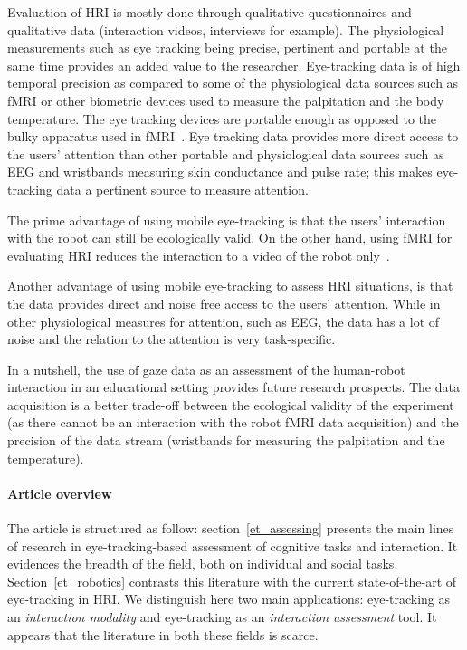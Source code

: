 \documentclass{sig-alternate}
\begin{document}
Evaluation of HRI is mostly done through qualitative questionnaires and
qualitative data (interaction videos, interviews for example). The physiological
measurements such as eye tracking being precise, pertinent and portable at the
same time provides an added value to the researcher.  Eye-tracking data is of
high temporal precision as compared to some of the physiological data sources
such as fMRI or other biometric devices used to measure the palpitation and the
body temperature. The eye tracking devices are portable enough as opposed to the
bulky apparatus used in fMRI~\cite{rosenthal2013neural}. Eye tracking data
provides more direct access to the users' attention than other portable and
physiological data sources such as EEG and wristbands measuring skin conductance
and pulse rate; this makes eye-tracking data a pertinent source to measure
attention.

The prime advantage of using mobile eye-tracking is that the users' interaction
with the robot can still be ecologically valid. On the other hand, using fMRI
for evaluating HRI reduces the interaction to a video of the robot
only~\cite{rosenthal2013neural}.

Another advantage of using mobile eye-tracking to assess HRI situations, is that
the data provides direct and noise free access to the users' attention. While in
other physiological measures for attention, such as EEG, the data has a lot of
noise and the relation to the attention is very task-specific.

In a nutshell, the use of gaze data as an assessment of the human-robot
interaction in an educational setting provides future research prospects. The
data acquisition is a better trade-off between the ecological validity of the
experiment (as there cannot be an interaction with the robot fMRI data
acquisition) and the precision of the data stream (wristbands for measuring the
palpitation and the temperature).

\paragraph{Article overview}

The article is structured as follow: section~\ref{et_assessing} presents the
main lines of research in eye-tracking-based assessment of cognitive
tasks and interaction. It evidences the breadth of the field, both on individual
and social tasks. Section~\ref{et_robotics} contrasts this literature with the
current state-of-the-art of eye-tracking in HRI. We distinguish here two main
applications: eye-tracking as an \emph{interaction modality} and eye-tracking as
an \emph{interaction assessment} tool. It appears that the literature in both
these fields is scarce.
\end{document}
